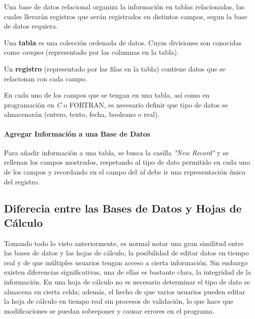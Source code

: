 Una base de datos relacional organiza la información en tablas relacionadas, las cuales llevarán registros que serán registrados en distintos campos, segun la base de datos requiera.
\vspace{0.5cm}
\begin{definicion}
	Una \textbf{tabla} es una colección ordenada de datos. Cuyas divisiones son conocidas como \textit{campos} (representado por las columnas en la tabla).
\end{definicion}

\vspace{0.5cm}
\begin{definicion}
	Un \textbf{registro} (representado por las filas en la tabla) contiene datos que se relacionan con cada campo.
\end{definicion}

En cada uno de los campos que se tengan en una tabla, así como en programación en \textit{C} o FORTRAN, es necesario definir que tipo de datos se almacenarán (entero, texto, fecha, booleano o real).

\paragraph{Agregar Información a una Base de Datos}

Para añadir información a una tabla, se busca la casilla \textit{"New Record"} y se rellenan los campos mostrados, respetando al tipo de dato permitido en cada uno de los campos y recordando en el campo del \textit{id} debe ir una representación única del registro.



\subsection{Diferecia entre las Bases de Datos y Hojas de Cálculo}

Tomando todo lo visto anteriormente, es normal notar una gran similitud entre las bases de datos y las hojas de cálculo, la posibilidad de editar datos en tiempo real y de que múltiples usuarios tengan acceso a cierta información. Sin embargo existen diferencias significativas, una de ellas es bastante clara, la integridad de la información. En una hoja de cálculo no es necesario determinar el tipo de dato se almacena en cierta celda; además, el hecho de que varios usuarios pueden editar la hoja de cálculo en tiempo real sin procesos de validación, lo que hace que modificaciones se puedan sobreponer y causar errores en el programa.

